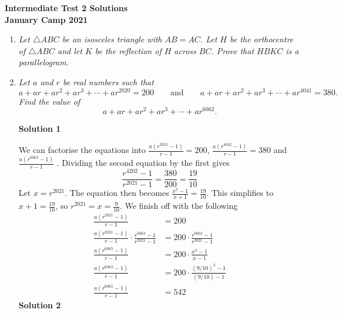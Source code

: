 \documentclass{article}
\begin{document}
\thispagestyle{empty}

\begin{center}
  \textbf{\Large Intermediate Test 2 Solutions}
  \\ \vspace{1em}
  \textbf{\large January Camp 2021}
\end{center}

\vspace{24pt}

\begin{enumerate}[1.]

  \item %
  {\itshape Let $\triangle ABC$ be an isosceles triangle with $AB = AC$. Let $H$ be the orthocentre of $\triangle ABC$ and let $K$ be the reflection of $H$ across $BC$. Prove that $HBKC$ is a parallelogram.}
  
  
  \item %
  {\itshape Let $a$ and $r$ be real numbers such that
  \[ a +ar +ar^2 +ar^3 +\dotsb +ar^{2020} = 200 \qquad\text{and}\qquad a +ar +ar^2 +ar^3 +\dotsb +ar^{4041} = 380. \]
  Find the value of
  \[ a +ar +ar^2 +ar^3 +\dotsb +ar^{6062}. \]}
  
  \textbf{Solution 1}\newline

We can factorise the equations into $\frac{a(r^{2021} - 1)}{r - 1} = 200$, $\frac{a(r^{4042} - 1)}{r - 1} = 380$ and $\frac{a(r^{6063} - 1)}{r - 1}$ . Dividing the second equation by the first gives $$\frac{r^{4202} - 1}{r^{2021} - 1} = \frac{380}{200} = \frac{19}{10}$$ Let $x = r^{2021}$. The equation then becomes $\frac{x^2 - 1}{x + 1} = \frac{19}{10}$. This simplifies to $x + 1 = \frac{19}{10}$, so $r^{2021} = x = \frac{9}{10}$. We finish off with the following
\begin{align*}
\frac{a(r^{2021} - 1)}{r - 1} &= 200\\
\frac{a(r^{2021} - 1)}{r - 1}\cdot \frac{r^{6063} - 1}{r^{2021} - 1} &= 200\cdot \frac{r^{6063} - 1}{r^{2021} - 1}\\
\frac{a(r^{6063} - 1)}{r - 1} &= 200 \cdot \frac{x^3 - 1}{x - 1}\\
\frac{a(r^{6063} - 1)}{r - 1} &= 200 \cdot \frac{(9/10)^3 - 1}{(9/10) - 1}\\
\frac{a(r^{6063} - 1)}{r - 1} &= 542
\end{align*}
\textbf{Solution 2}\newline


\end{enumerate}
\end{document}
